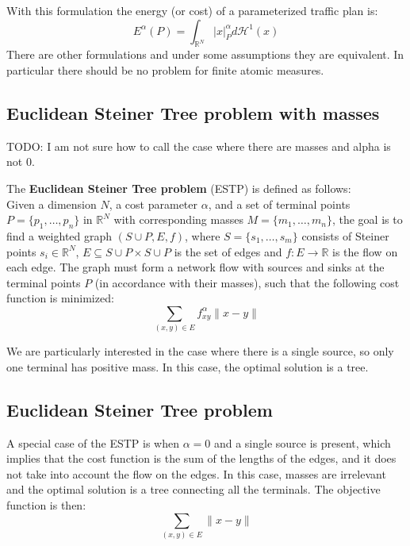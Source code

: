 \documentclass{article}
\begin{document}
    With this formulation the energy (or cost) of a parameterized traffic plan is:
    \begin{equation}
        E^{\alpha}(P) = \int_{\mathbb{R}^N} |x|_P^{\alpha} d \mathcal{H}^1(x)
    \end{equation}
    There are other formulations and under some assumptions they are equivalent. In particular there should be no problem
    for finite atomic measures.

    \subsection{Euclidean Steiner Tree problem with masses}

    TODO: I am not sure how to call the case where there are masses and alpha is not 0.

    The \textbf{Euclidean Steiner Tree problem} (ESTP) is defined as follows: \\
    Given a dimension $N$, a cost parameter $\alpha$, and a set of terminal points $P = \{p_1, \ldots, p_n\}$ in $\mathbb{R}^N$ with
    corresponding masses $M = \{m_1, \ldots, m_n\}$, the goal is to find a weighted graph $(S \cup P, E, f)$, where $S = \{s_1, \ldots, s_m\}$
    consists of Steiner points $s_i \in \mathbb{R}^N$, $E \subseteq S \cup P \times S \cup P$ is the set of edges and
    $f : E \rightarrow \mathbb{R}$ is the flow on each edge.
    The graph must form a network flow with sources and sinks at the terminal points $P$ (in accordance with their masses), such that the following cost function is minimized:
    \[
        \sum_{(x,y) \in E} f_{xy}^\alpha \|x - y\|
    \]

    We are particularly interested in the case where there is a single source, so only one terminal has positive mass. In this case, the optimal solution is a tree.

    \subsection{Euclidean Steiner Tree problem}

    A special case of the ESTP is when $\alpha=0$ and a single source is present, which implies that the cost function is
    the sum of the lengths of the edges, and it does not take into account the flow on the edges.
    In this case, masses are irrelevant and the optimal solution is a tree connecting all the terminals.
    The objective function is then:
    \begin{equation}
        \sum_{(x,y) \in E} \|x - y\|
    \end{equation}
\end{document}
